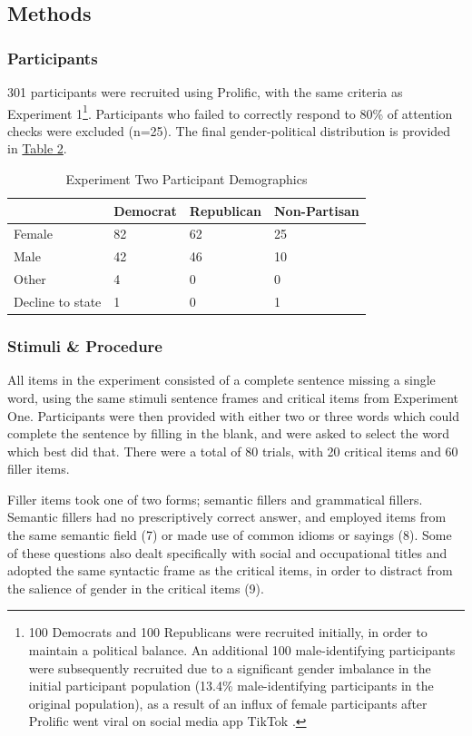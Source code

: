 \documentclass[10pt,letterpaper]{article}
\begin{document}
	\subsection{Methods}
	\subsubsection{Participants} 301 participants were recruited using Prolific, with the same criteria as Experiment 1\footnote{100 Democrats and 100 Republicans were recruited initially, in order to maintain a political balance. An additional 100 male-identifying participants were subsequently recruited due to a significant gender imbalance in the initial participant population (13.4\% male-identifying participants in the original population), as a result of an influx of female participants after Prolific went viral on social media app TikTok \parencite{charalambides2021}.}. Participants who failed to correctly respond to 80\% of attention checks were excluded (n=25). The final gender-political distribution is provided in \hyperref[exp2-sample-table]{Table 2}.\par

	\begin{table}[!ht]
		\begin{center} 
			\caption{Experiment Two Participant Demographics} 
			\label{exp2-sample-table} 
			\vskip 0.12in
			\begin{tabular}{llll} 
				\hline
				&  Democrat & Republican & Non-Partisan \\
				\hline
				Female &  82 & 62 & 25 \\
				Male & 42 & 46 & 10 \\
				Other & 4 & 0 & 0 \\
				Decline to state & 1 & 0 & 1 \\
				\hline
			\end{tabular} 
		\end{center} 
	\end{table}
	
	\subsubsection{Stimuli \& Procedure} All items in the experiment consisted of a complete sentence missing a single word, using the same stimuli sentence frames and critical items from Experiment One. Participants were then provided with either two or three words which could complete the sentence by filling in the blank, and were asked to select the word which best did that. There were a total of 80 trials, with 20 critical items and 60 filler items.\par 
	Filler items took one of two forms; semantic fillers and grammatical fillers. Semantic fillers had no prescriptively correct answer, and employed items from the same semantic field (7) or made use of common idioms or sayings (8). Some of these questions also dealt specifically with social and occupational titles and adopted the same syntactic frame as the critical items, in order to distract from the salience of gender in the critical items (9). 
	
\end{document}
